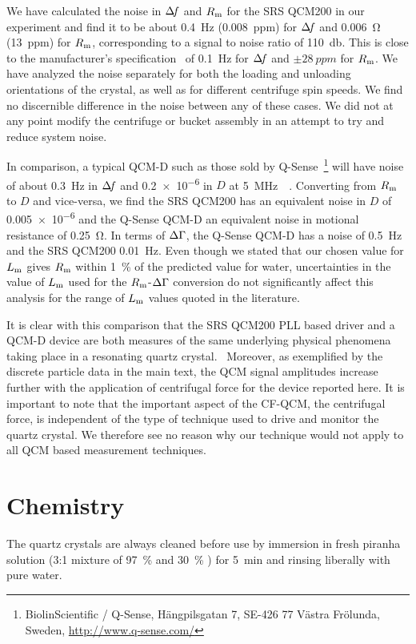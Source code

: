 We have calculated the noise in $\Delta\!f$ and $R_\mathrm{m}$ for the SRS QCM200 in our
experiment and find it to be about \SI{0.4}{\hertz} (\SI{0.008}{ppm}) for
$\Delta\!f$ and \SI{0.006}{\ohm} (\SI{13}{ppm}) for $R_\mathrm{m}$, corresponding to a
signal to noise ratio of \SI{110}{\decibel}.  This is close to the
manufacturer's specification~\cite{srsqcm200manual} of \SI{0.1}{\hertz} for
$\Delta\!f$ and $\pm\SI{28}{ppm}$ for $R_\mathrm{m}$.  We have analyzed the noise
separately for both the loading and unloading orientations of the crystal,
as well as for different centrifuge spin speeds.  We find no discernible
difference in the noise between any of these cases.  We did not at any
point modify the centrifuge or bucket assembly in an attempt to try and
reduce system noise.

In comparison, a typical QCM-D such as those sold by
Q-Sense~\footnote{BiolinScientific / Q-Sense, Hängpilsgatan 7, SE-426 77
Västra Frölunda, Sweden,  \url{http://www.q-sense.com/}} will have noise of
about \SI{0.3}{\hertz} in $\Delta\!f$ and \num{0.2e-6} in $D$ at
\SI{5}{\mega\hertz}~\cite{su2005comparison}~\cite{peh2007understanding}.
Converting from $R_\mathrm{m}$ to $D$ and vice-versa, we find the SRS QCM200 has an
equivalent noise in $D$ of \num{0.005e-6} and the Q-Sense QCM-D an
equivalent noise in motional resistance of \SI{0.25}{\ohm}.  In terms of
$\Delta\Gamma$, the Q-Sense QCM-D has a noise of \SI{0.5}{\hertz} and the SRS QCM200
\SI{0.01}{\hertz}.  Even though we stated that our chosen value for $L_\mathrm{m}$
gives $R_\mathrm{m}$ within \SI{1}{\percent} of the predicted value for water,
uncertainties in the value of $L_\mathrm{m}$ used for the $R_\mathrm{m}$-$\Delta\Gamma$ conversion do
not significantly affect this analysis for the range of $L_\mathrm{m}$ values quoted
in the literature.

It is clear with this comparison that the SRS QCM200 PLL based driver and a
QCM-D device are both measures of the same underlying physical phenomena
taking place in a resonating quartz crystal.~\cite{geelhood2002transient}
Moreover, as exemplified by the discrete particle data in the main text,
the QCM signal amplitudes increase further with the application of
centrifugal force for the device reported here.  It is important to note
that the important aspect of the CF-QCM, the centrifugal force, is
independent of the type of technique used to drive and monitor the quartz
crystal.  We therefore see no reason why our technique would not apply to
all QCM based measurement techniques.  

\section{Chemistry}
The quartz crystals are always cleaned before use by immersion
in fresh piranha solution (3:1 mixture of \SI{97}{\percent}  and
\SI{30}{\percent} ) for \SI{5}{\minute} and rinsing liberally with
pure water.

